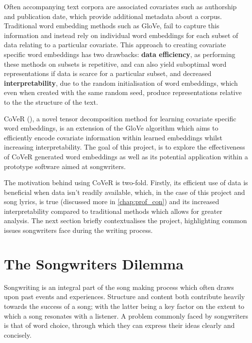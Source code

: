 \noindent
\newline
Often accompanying text corpora are associated covariates such as authorship and publication date, which provide additional metadata about a corpus. Traditional word embedding methods such as GloVe, fail to capture this information and instead rely on individual word embeddings for each subset of data relating to a particular covariate. This approach to creating covariate specific word embeddings has two drawbacks: \textbf{data efficiency}, as performing these methods on subsets is repetitive, and can also yield suboptimal word representations if data is scarce for a particular subset, and decreased \textbf{interpretability}, due to the random initialisation of word embeddings, which even when created with the same random seed, produce representations relative to the the structure of the text. 

\noindent
\newline
CoVeR (\cite{Tian2018}), a novel tensor decomposition method for learning covariate specific word embeddings, is an extension of the GloVe algorithm which aims to efficiently encode covariate information within learned embeddings whilst increasing interpretability. The goal of this project, is to explore the effectiveness of CoVeR generated word embeddings as well as its potential application within a prototype software aimed at songwriters. 

\noindent
\newline
The motivation behind using CoVeR is two-fold. Firstly, its efficient use of data is beneficial when data isn't readily available, which, in the case of this project and song lyrics, is true (discussed more in \autoref{chap:prof_con}) and its increased interpretability compared to traditional methods which allows for greater analysis. The next section briefly contextualises the project, highlighting common issues songwriters face during the writing process.

\section{The Songwriters Dilemma}
Songwriting is an integral part of the song making process which often draws upon past events and experiences. Structure and content both contribute heavily towards the success of a song; with the latter being a key factor on the extent to which a song resonates with a listener. A problem commonly faced by songwriters is that of word choice, through which they can express their ideas clearly and concisely.

